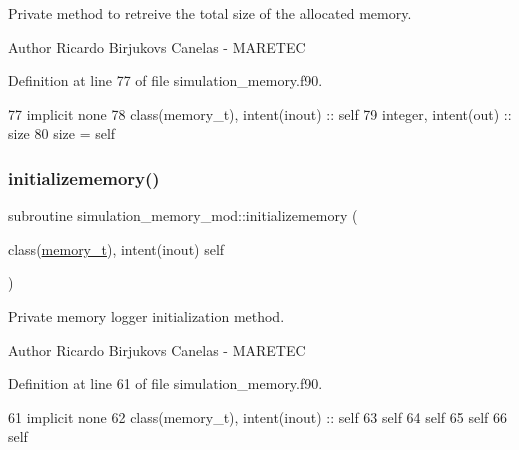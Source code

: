 Private method to retreive the total size of the allocated memory. 

\begin{DoxyAuthor}{Author}
Ricardo Birjukovs Canelas -\/ M\+A\+R\+E\+T\+EC 
\end{DoxyAuthor}


Definition at line 77 of file simulation\+\_\+memory.\+f90.


\begin{DoxyCode}
77     \textcolor{keywordtype}{implicit none}
78     \textcolor{keywordtype}{class}(memory\_t), \textcolor{keywordtype}{intent(inout)} :: self
79     \textcolor{keywordtype}{integer}, \textcolor{keywordtype}{intent(out)} :: size
80     \textcolor{keyword}{size} = self%
\end{DoxyCode}
\mbox{\label{namespacesimulation__memory__mod_ac8306165e4ec88fec9a2b8b719f61893}} 
\subsubsection{\texorpdfstring{initializememory()}{initializememory()}}
{\footnotesize\ttfamily subroutine simulation\+\_\+memory\+\_\+mod\+::initializememory (\begin{DoxyParamCaption}\item[{class(\mbox{\hyperlink{structsimulation__memory__mod_1_1memory__t}{memory\+\_\+t}}), intent(inout)}]{self }\end{DoxyParamCaption})\hspace{0.3cm}{\ttfamily [private]}}



Private memory logger initialization method. 

\begin{DoxyAuthor}{Author}
Ricardo Birjukovs Canelas -\/ M\+A\+R\+E\+T\+EC 
\end{DoxyAuthor}


Definition at line 61 of file simulation\+\_\+memory.\+f90.


\begin{DoxyCode}
61     \textcolor{keywordtype}{implicit none}
62     \textcolor{keywordtype}{class}(memory\_t), \textcolor{keywordtype}{intent(inout)} :: self
63     self%
64     self%
65     self%
66     self%
\end{DoxyCode}
\mbox{\label{namespacesimulation__memory__mod_a16a7a1c7e88fe5a5523d23f83f0e04a0}} 
